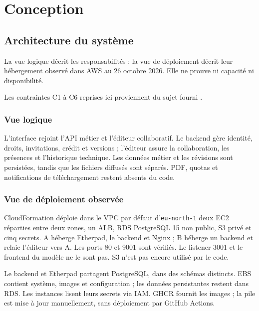\chapter{Conception}

\section{Architecture du système}\label{sec:architecture-systeme}

La vue logique décrit les responsabilités ; la vue de déploiement décrit leur hébergement observé dans AWS au 26 octobre 2026. Elle ne prouve ni capacité ni disponibilité.

Les contraintes C1 à C6 reprises ici proviennent du sujet fourni \cite[p. 2--3]{sujet}.

\subsection{Vue logique}

L'interface rejoint l'API métier et l'éditeur collaboratif. Le backend gère identité, droits, invitations, crédit et versions ; l'éditeur assure la collaboration, les présences et l'historique technique. Les données métier et les révisions sont persistées, tandis que les fichiers diffusés sont séparés. PDF, quotas et notifications de téléchargement restent absents du code.

\subsection{Vue de déploiement observée}

CloudFormation déploie dans le VPC par défaut d'\texttt{eu-north-1} deux EC2 réparties entre deux zones, un ALB, RDS PostgreSQL 15 non public, S3 privé et cinq secrets. A héberge Etherpad, le backend et Nginx ; B héberge un backend et relaie l'éditeur vers A. Les ports 80 et 9001 sont vérifiés. Le listener 3001 et le frontend du modèle ne le sont pas. S3 n'est pas encore utilisé par le code. \cite{aws-local-artifacts}

Le backend et Etherpad partagent PostgreSQL, dans des schémas distincts. EBS contient système, images et configuration ; les données persistantes restent dans RDS. Les instances lisent leurs secrets via IAM. GHCR fournit les images ; la pile est mise à jour manuellement, sans déploiement par GitHub Actions.

